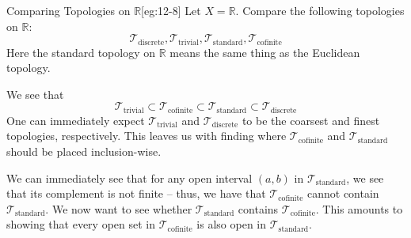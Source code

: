 \begin{egBox}{Comparing Topologies on \( \mathbb{R} \)}[eg:12-8]
    Let \( X = \mathbb{R} \). Compare the following topologies on 
    \( \mathbb{R} \):
    \begin{equation*}
        \mathcal{T}_{ \mathrm{discrete} },
        \mathcal{T}_{ \mathrm{trivial} },
        \mathcal{T}_{ \mathrm{standard} },
        \mathcal{T}_{ \mathrm{cofinite} }
    \end{equation*}
    Here the standard topology on \( \mathbb{R} \) means the same thing as the 
    Euclidean topology. 

    \baseSkip

    We see that 
    \begin{equation*}
        \mathcal{T}_{ \mathrm{trivial} }
        \subset
        \mathcal{T}_{ \mathrm{cofinite} }
        \subset
        \mathcal{T}_{ \mathrm{standard} }
        \subset
        \mathcal{T}_{ \mathrm{discrete} }
    \end{equation*}
    One can immediately expect \( \mathcal{T}_{ \mathrm{trivial} } \) and 
    \( \mathcal{T}_{ \mathrm{discrete} } \) to be the coarsest and finest
    topologies, respectively.
    This leaves us with finding where \( \mathcal{T}_{ \mathrm{cofinite} } \) 
    and \( \mathcal{T}_{ \mathrm{standard} } \) should be placed inclusion-wise.

    \baseSkip

    We can immediately see that for any open interval \( ( a, b ) \) in 
    \( \mathcal{T}_{ \mathrm{standard} } \), we see that its complement 
    is not finite -- thus, we have that \( \mathcal{T}_{ \mathrm{cofinite} } \)
    cannot contain \( \mathcal{T}_{ \mathrm{standard} } \).
    We now want to see whether \( \mathcal{T}_{ \mathrm{standard} } \) contains
    \( \mathcal{T}_{ \mathrm{cofinite} } \).
    This amounts to showing that every open set in 
    \( \mathcal{T}_{ \mathrm{cofinite} } \) is also open in 
    \( \mathcal{T}_{ \mathrm{standard} } \).

    \baseSkip


\end{egBox}
